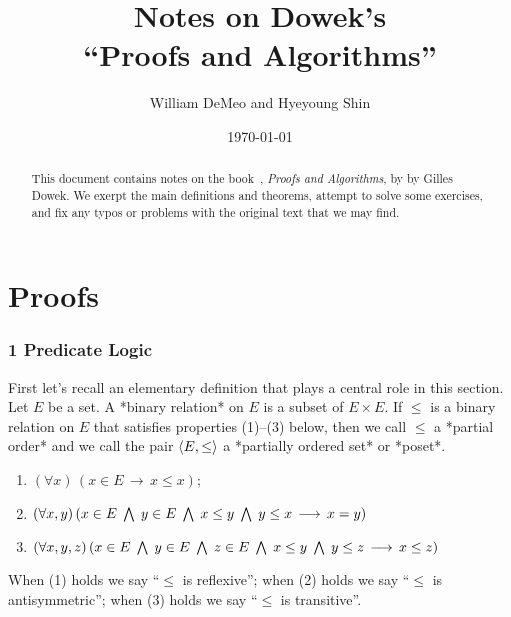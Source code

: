 % 


\starON
\title[Notes on Dowek]{Notes on Dowek's\\
 ``Proofs and Algorithms''}
\date{\today}
\author[W.~DeMeo and H.~Shin]{William DeMeo and Hyeyoung Shin}
\address{University of Hawaii}

\begin{abstract}
This document contains notes on the book~\cite{MR3012378}, {\it Proofs and
Algorithms}, by by Gilles Dowek.  We exerpt the main definitions and theorems,
attempt to solve some exercises, and fix any typos or problems with the original
text that we may find.
\end{abstract}

\maketitle


\part{Proofs}

\section{1 Predicate Logic}


First let's recall an elementary definition that plays a central role in this
section.
Let $E$ be a set.  A *binary relation* on $E$ is a subset of $E\times E$.
If $\leq$ is a binary relation on $E$ that satisfies properties (1)--(3) below, 
then we call $\leq$ a *partial order* and we call the pair
$\langle E, \leq\rangle$ a *partially ordered set* or *poset*.
\begin{enumerate}
\item $(\forall x) \, (x\in E \, \longrightarrow \, x\leq x)$;
\item $(\forall x, y)\, %
(x\in E\; \Meet \; y\in E \; \Meet \; x\leq y \; \Meet \; y \leq x \,
\longrightarrow\, x=y)$
\item $(\forall x, y, z)\, %
(x\in E\; \Meet \; y\in E \; \Meet \; z\in E \; \Meet \; x\leq y \; \Meet \; y \leq z \,
\longrightarrow\, x\leq z)$
\end{enumerate}
When (1) holds we say ``$\leq$ is reflexive''; 
when (2) holds we say ``$\leq$ is antisymmetric''; 
when (3) holds we say ``$\leq$ is transitive''. 

